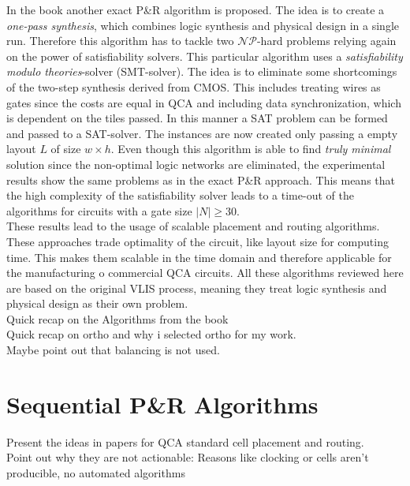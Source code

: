 In the book \cite{Walter} another exact P\&R algorithm is proposed. The idea is to create a \textit{one-pass synthesis}, which combines logic synthesis and physical design in a single run. Therefore this algorithm has to tackle two $\mathcal{NP}$-hard problems relying again on the power of satisfiability solvers. This particular algorithm uses a \textit{satisfiability modulo theories}-solver (SMT-solver). The idea is to eliminate some shortcomings of the two-step synthesis derived from CMOS. This includes treating wires as gates since the costs are equal in QCA and including data synchronization, which is dependent on the tiles passed. In this manner a SAT problem can be formed and passed to a SAT-solver. The instances are now created only passing a empty layout $L$ of size $w \times h$. Even though this algorithm is able to find \textit{truly minimal} solution since the non-optimal logic networks are eliminated, the experimental results show the same problems as in the exact P\&R approach. This means that the high complexity of the satisfiability solver leads to a time-out of the algorithms for circuits with a gate size $|N| \geq 30$.\\
These results lead to the usage of scalable placement and routing algorithms. These approaches trade optimality of the circuit, like layout size for computing time. This makes them scalable in the time domain and therefore applicable for the manufacturing o commercial QCA circuits. All these algorithms reviewed here are based on the original VLIS process, meaning they treat logic synthesis and physical design as their own problem.\\




Quick recap on the Algorithms from the book \\
Quick recap on ortho and why i selected ortho for my work.\\
Maybe point out that balancing is not used.

\section{Sequential P\&R Algorithms}
Present the ideas in papers for QCA standard cell placement and routing. \\
Point out why they are not actionable: Reasons like clocking or cells aren't producible, no automated algorithms
